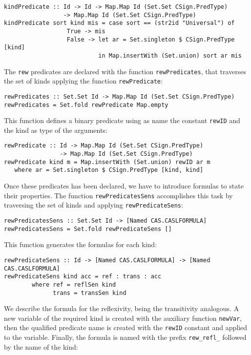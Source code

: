 {\codesize
\begin{verbatim}
kindPredicate :: Id -> Id -> Map.Map Id (Set.Set CSign.PredType)
                 -> Map.Map Id (Set.Set CSign.PredType)
kindPredicate sort kind mis = case sort == (str2id "Universal") of
                  True -> mis
                  False -> let ar = Set.singleton $ CSign.PredType [kind]
                           in Map.insertWith (Set.union) sort ar mis
\end{verbatim}
}

The \verb"rew" predicates are declared with the function
\verb"rewPredicates", that traverses the set of kinds applying
the function \verb"rewPredicate":

{\codesize
\begin{verbatim}
rewPredicates :: Set.Set Id -> Map.Map Id (Set.Set CSign.PredType)
rewPredicates = Set.fold rewPredicate Map.empty
\end{verbatim}
}

This function defines a binary predicate using as name the constant
\verb"rewID" and the kind as type of the arguments:

{\codesize
\begin{verbatim}
rewPredicate :: Id -> Map.Map Id (Set.Set CSign.PredType)
                -> Map.Map Id (Set.Set CSign.PredType)
rewPredicate kind m = Map.insertWith (Set.union) rewID ar m
   where ar = Set.singleton $ CSign.PredType [kind, kind]
\end{verbatim}
}

Once these predicates has been declared, we have to introduce
formulas to state their properties. The function \verb"rewPredicatesSens"
accomplishes this task by traversing the set of kinds and applying
\verb"rewPredicateSens":

{\codesize
\begin{verbatim}
rewPredicatesSens :: Set.Set Id -> [Named CAS.CASLFORMULA]
rewPredicatesSens = Set.fold rewPredicateSens []
\end{verbatim}
}

This function generates the formulas for each kind:

{\codesize
\begin{verbatim}
rewPredicateSens :: Id -> [Named CAS.CASLFORMULA] -> [Named CAS.CASLFORMULA]
rewPredicateSens kind acc = ref : trans : acc
        where ref = reflSen kind
              trans = transSen kind
\end{verbatim}
}

We describe the formula for the reflexivity, being the transitivity
analogous. A new variable of the required kind is created with
the auxiliary function \verb"newVar", then the qualified predicate
name is created with the \verb"rewID" constant and applied to the
variable. Finally, the formula is named with the prefix \verb"rew_refl_"
followed by the name of the kind:

